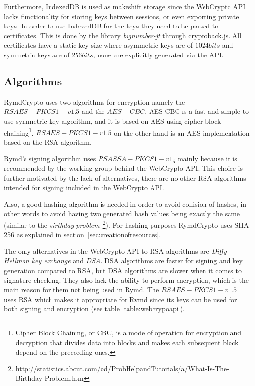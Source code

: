 Furthermore, IndexedDB is used as makeshift storage since the WebCrypto API lacks functionality for storing keys between sessions, or even exporting private keys. In order to use IndexedDB for the keys they need to be parsed to certificates. This is done by the library \emph{bignumber-jt} through cryptoback.js. All certificates have a static key size where asymmetric keys are of $1024bits$ and symmetric keys are of $256bits$; none are explicitly generated via the API.

\subsection{Algorithms}
RymdCrypto uses two algorithms for encryption namely the $RSAES-PKCS1-v1.5$ and the $AES-CBC$. AES-CBC is a fast and simple to use symmetric key algorithm, and it is based on AES using cipher block chaining\footnote{Cipher Block Chaining, or CBC, is a mode of operation for encryption and decryption that divides data into blocks and makes each subsequent block depend on the preceeding ones.\cite{SearchSecurityCipherBlockChaining:Online}}\cite{AESISFAST:Online}. $RSAES-PKCS1-v1.5$ on the other hand is an AES implementation based on the RSA algorithm.

Rymd's signing algorithm uses $RSASSA-PKCS1-v1_5$ mainly because it is recommended by the working group behind the WebCrypto API. This choice is further motivated by the lack of alternatives, there are no other RSA algorithms intended for signing included in the WebCrypto API.

Also, a good hashing algorithm is needed in order to avoid collision of hashes, in other words to avoid having two generated hash values being exactly the same (similar to the \emph{birthday problem}~\footnote{http://statistics.about.com/od/ProbHelpandTutorials/a/What-Is-The-Birthday-Problem.htm}). For hashing purposes RymdCrypto uses SHA-256 as explained in section~\ref{sec:creationofresources}.

The only alternatives in the WebCrypto API to RSA algorithms are \emph{Diffy-Hellman key exchange} and \emph{DSA}. DSA algorithms are faster for signing and key generation compared to RSA, but DSA algorithms are slower when it comes to signature checking. They also lack the ability to perform encryption, which is the main reason for them not being used in Rymd. The $RSAES-PKCS1-v1.5$ uses RSA which makes it appropriate for Rymd since its keys can be used for both signing and encryption (see table \ref{table:webcrypoapi}).

